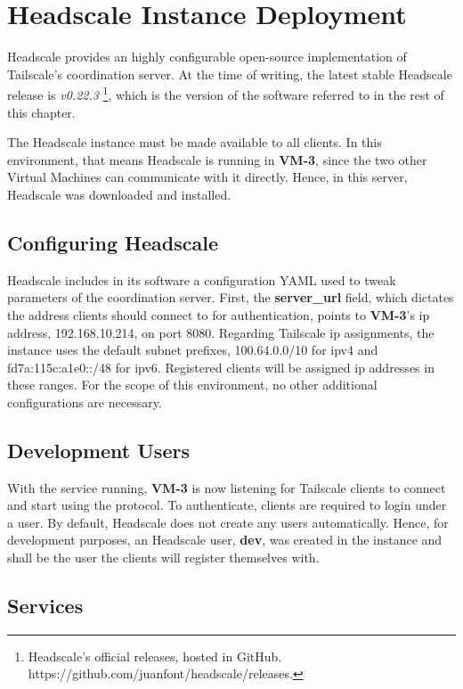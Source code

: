 \documentclass[11pt,twoside,a4paper]{report}
\begin{document}
\section{Headscale Instance Deployment}
\label{sec:devhs}

Headscale provides an highly configurable open-source implementation of Tailscale's coordination server. At the time of writing, the latest stable Headscale release is \emph{v0.22.3} \footnote{Headscale's official releases, hosted in GitHub. https://github.com/juanfont/headscale/releases.}, which is the version of the software referred to in the rest of this chapter.

The Headscale instance must be made available to all clients. In this environment, that means Headscale is running in \textbf{VM-3}, since the two other Virtual Machines can communicate with it directly. Hence, in this server, Headscale was downloaded and installed.

\subsection{Configuring Headscale}

Headscale includes in its software a configuration YAML used to tweak parameters of the coordination server. First, the \textbf{server\_url} field, which dictates the address clients should connect to for authentication, points to \textbf{VM-3}'s \ac{ip} address, 192.168.10.214, on port 8080. Regarding Tailscale \ac{ip} assignments, the instance uses the default subnet prefixes, 100.64.0.0/10 for ipv4 and fd7a:115c:a1e0::/48 for ipv6. Registered clients will be assigned \ac{ip} addresses in these ranges. For the scope of this environment, no other additional configurations are necessary.

\subsection{Development Users}

With the service running, \textbf{VM-3} is now listening for Tailscale clients to connect and start using the protocol. To authenticate, clients are required to login under a user. By default, Headscale does not create any users automatically. Hence, for development purposes, an Headscale user, \textbf{dev}, was created in the instance and shall be the user the clients will register themselves with.

\subsection{Services}
\end{document}
